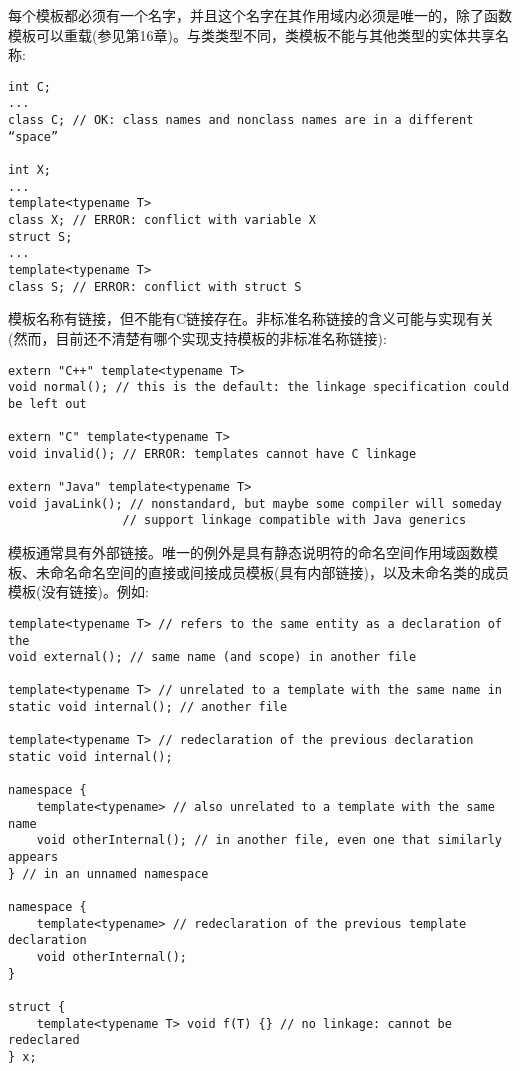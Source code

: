 每个模板都必须有一个名字，并且这个名字在其作用域内必须是唯一的，除了函数模板可以重载(参见第16章)。与类类型不同，类模板不能与其他类型的实体共享名称:

\begin{lstlisting}[style=styleCXX]
int C;
...
class C; // OK: class names and nonclass names are in a different “space”

int X;
...
template<typename T>
class X; // ERROR: conflict with variable X
struct S;
...
template<typename T>
class S; // ERROR: conflict with struct S
\end{lstlisting}

模板名称有链接，但不能有C链接存在。非标准名称链接的含义可能与实现有关(然而，目前还不清楚有哪个实现支持模板的非标准名称链接):

\begin{lstlisting}[style=styleCXX]
extern "C++" template<typename T>
void normal(); // this is the default: the linkage specification could be left out

extern "C" template<typename T>
void invalid(); // ERROR: templates cannot have C linkage

extern "Java" template<typename T>
void javaLink(); // nonstandard, but maybe some compiler will someday
				// support linkage compatible with Java generics
\end{lstlisting}

模板通常具有外部链接。唯一的例外是具有静态说明符的命名空间作用域函数模板、未命名命名空间的直接或间接成员模板(具有内部链接)，以及未命名类的成员模板(没有链接)。例如:

\begin{lstlisting}[style=styleCXX]
template<typename T> // refers to the same entity as a declaration of the
void external(); // same name (and scope) in another file

template<typename T> // unrelated to a template with the same name in
static void internal(); // another file

template<typename T> // redeclaration of the previous declaration
static void internal();

namespace {
	template<typename> // also unrelated to a template with the same name
	void otherInternal(); // in another file, even one that similarly appears
} // in an unnamed namespace

namespace {
	template<typename> // redeclaration of the previous template declaration
	void otherInternal();
}

struct {
	template<typename T> void f(T) {} // no linkage: cannot be redeclared
} x;
\end{lstlisting}

